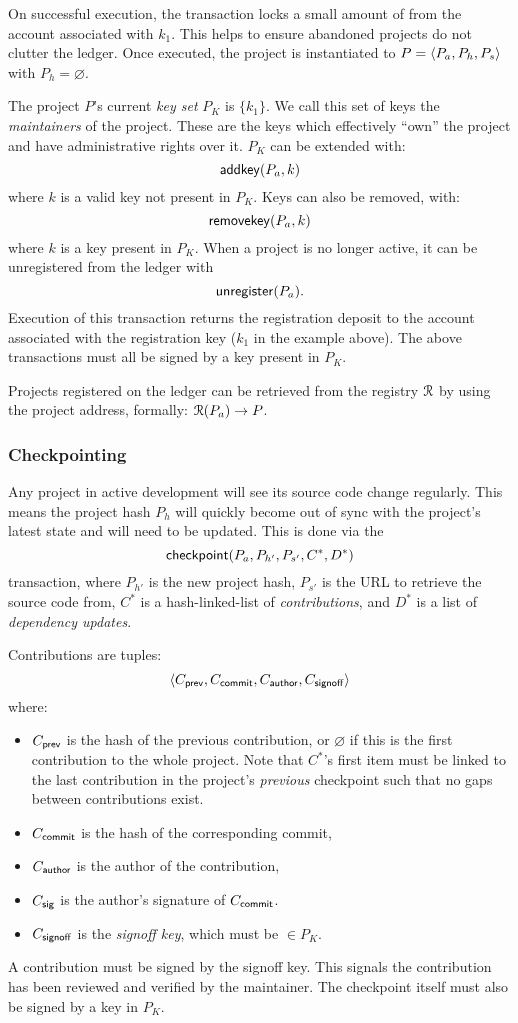 On successful execution, the transaction locks a small amount of \oscoin{} from
the account associated with $k_1$. This helps to ensure abandoned projects
do not clutter the ledger.  Once executed, the project is instantiated to $P =
\langle P_a, P_h, P_s\rangle$ with $P_h = \varnothing$.

The project $P$'s current \emph{key set} $P_K$ is $\{k_1\}$. We call this set of
keys the \emph{maintainers} of the project. These are the keys which effectively
``own'' the project and have administrative rights over it. $P_K$ can be extended
with:
\[
    \mathsf{addkey}\lparen P_a, k\rparen
\]
where $k$ is a valid key not present in $P_K$. Keys can also be removed, with:
\[
    \mathsf{removekey}\lparen P_a, k\rparen
\]
where $k$ is a key present in $P_K$. When a project is no longer active, it can be
unregistered from the ledger with
\[
    \mathsf{unregister}\lparen P_a\rparen.
\]
Execution of this transaction returns the registration deposit to the account
associated with the registration key ($k_1$ in the example above).  The above
transactions must all be signed by a key present in $P_K$.

Projects registered on the ledger can be retrieved from the registry $\mathcal{R}$ by
using the project address, formally: $\mathcal{R}(P_a) \to P$.

\subsubsection{Checkpointing} \label{s:checkpointing} Any project in active
development will see its source code change regularly. This means the project
hash $P_h$ will quickly become out of sync with the project's latest state and
will need to be updated. This is done via the
\[
    \mathsf{checkpoint}\lparen P_a, P_{h'}, P_{s'}, C^*, D^*\rparen
\]
transaction, where $P_{h'}$ is the new project hash, $P_{s'}$ is the URL to
retrieve the source code from, $C^*$ is a hash-linked-list of
\emph{contributions}, and $D^*$ is a list of \emph{dependency updates}.

Contributions are tuples:
\[
   \langle C_{\mathsf{prev}}, C_{\mathsf{commit}}, C_{\mathsf{author}}, C_{\mathsf{signoff}}\rangle
\]
where:
\begin{itemize}
\item $C_{\mathsf{prev}}$ is the hash of the previous contribution, or
  $\varnothing$ if this is the first contribution to the whole
  project. Note that $C^*$'s first item must be linked to the last
  contribution in the project's \emph{previous} checkpoint such that no
  gaps between contributions exist.
\item $C_{\mathsf{commit}}$ is the hash of the corresponding commit,
\item $C_{\mathsf{author}}$ is the author of the contribution,
\item $C_{\mathsf{sig}}$ is the author's signature of $C_{\mathsf{commit}}$.
\item $C_{\mathsf{signoff}}$ is the \emph{signoff key}, which must be $\in P_K$.
\end{itemize}
A contribution must be signed by the signoff key. This signals
the contribution has been reviewed and verified by the maintainer. The
checkpoint itself must also be signed by a key in $P_K$.

